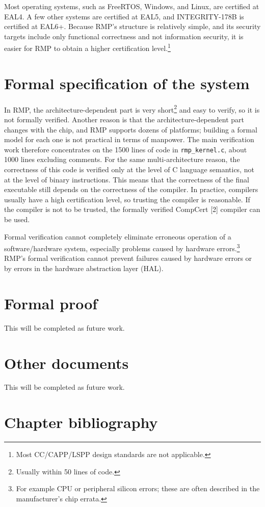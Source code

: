 Most operating systems, such as FreeRTOS, Windows, and Linux, are certified at EAL4.
A few other systems are certified at EAL5, and INTEGRITY-178B is certified at EAL6+.
Because RMP's structure is relatively simple, and its security targets include only functional correctness and not information security, it is easier for RMP to obtain a higher certification level.\footnote{Most CC/CAPP/LSPP design standards are not applicable.}

\section{Formal specification of the system}

In RMP, the architecture-dependent part is very short\footnote{Usually within 50 lines of code.} and easy to verify, so it is not formally verified.
Another reason is that the architecture-dependent part changes with the chip, and RMP supports dozens of platforms; building a formal model for each one is not practical in terms of manpower.
The main verification work therefore concentrates on the 1500 lines of code in \texttt{rmp\_kernel.c}, about 1000 lines excluding comments.
For the same multi-architecture reason, the correctness of this code is verified only at the level of C language semantics, not at the level of binary instructions.
This means that the correctness of the final executable still depends on the correctness of the compiler.
In practice, compilers usually have a high certification level, so trusting the compiler is reasonable.
If the compiler is not to be trusted, the formally verified CompCert [2] compiler can be used.

Formal verification cannot completely eliminate erroneous operation of a software/hardware system, especially problems caused by hardware errors.\footnote{For example CPU or peripheral silicon errors; these are often described in the manufacturer's chip errata.}
RMP's formal verification cannot prevent failures caused by hardware errors or by errors in the hardware abstraction layer (HAL).

\section{Formal proof}

This will be completed as future work.

\section{Other documents}

This will be completed as future work.

\section{Chapter bibliography}

\nocite{cc2012,compcert2012}
\printbibliography[heading=none]
